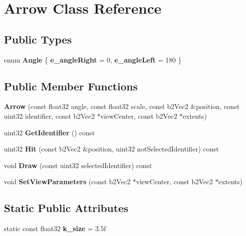 \hypertarget{classArrow}{\section{Arrow Class Reference}
\label{classArrow}
}
\subsection*{Public Types}
\begin{DoxyCompactItemize}
\item 
enum {\bfseries Angle} \{ {\bfseries e\-\_\-angle\-Right} = 0, 
{\bfseries e\-\_\-angle\-Left} = 180
 \}
\end{DoxyCompactItemize}
\subsection*{Public Member Functions}
\begin{DoxyCompactItemize}
\item 
\hypertarget{classArrow_a4b2461c938c8ac377dcad535abad12b5}{{\bfseries Arrow} (const float32 angle, const float32 scale, const b2\-Vec2 \&position, const uint32 identifier, const b2\-Vec2 $\ast$view\-Center, const b2\-Vec2 $\ast$extents)}\label{classArrow_a4b2461c938c8ac377dcad535abad12b5}

\item 
\hypertarget{classArrow_a0a9a29065f5b4a0a9b67759591439734}{uint32 {\bfseries Get\-Identifier} () const }\label{classArrow_a0a9a29065f5b4a0a9b67759591439734}

\item 
\hypertarget{classArrow_adb07f17f92d114dc444dbefc6e84f95c}{uint32 {\bfseries Hit} (const b2\-Vec2 \&position, uint32 not\-Selected\-Identifier) const }\label{classArrow_adb07f17f92d114dc444dbefc6e84f95c}

\item 
\hypertarget{classArrow_a60685846b03df80c3673d0bae78eaf9b}{void {\bfseries Draw} (const uint32 selected\-Identifier) const }\label{classArrow_a60685846b03df80c3673d0bae78eaf9b}

\item 
\hypertarget{classArrow_a276761ef539bfbacf4a8d439c91fb451}{void {\bfseries Set\-View\-Parameters} (const b2\-Vec2 $\ast$view\-Center, const b2\-Vec2 $\ast$extents)}\label{classArrow_a276761ef539bfbacf4a8d439c91fb451}

\end{DoxyCompactItemize}
\subsection*{Static Public Attributes}
\begin{DoxyCompactItemize}
\item 
\hypertarget{classArrow_ae33379f79df205a130f23ba6a6e4c35a}{static const float32 {\bfseries k\-\_\-size} = 3.\-5f}\label{classArrow_ae33379f79df205a130f23ba6a6e4c35a}

\end{DoxyCompactItemize}
